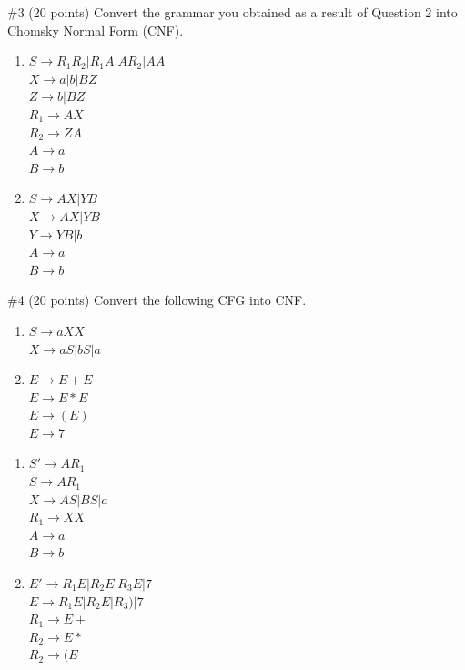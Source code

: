 \begin{problem}{\#3 (20 points)}
    Convert the grammar you obtained as a result of Question 2 into Chomsky Normal Form (CNF).
\end{problem}
\begin{solution}
    \begin{enumerate}[label=\alph*)]
        \item $S \to R_1R_2 | R_1A | AR_2 | AA $\\
        $X \to a | b | BZ$\\
        $Z \to b | BZ$\\
        $R_1 \to AX$\\
        $R_2 \to ZA$\\
        $A \to a$\\
        $B \to b$
        \item $S \to AX | YB$\\
        $X \to AX | YB$\\
        $Y \to YB | b$\\
        $A \to a$\\
        $B \to b$
    \end{enumerate}
\end{solution}

\begin{problem}{\#4 (20 points)}
    Convert the following CFG into CNF.
    \begin{enumerate}[label=\alph*)]
        \item $S \to aXX$\\
        $X \to aS | bS | a$
        \item $E \to E + E$\\
        $E \to E * E$\\
        $E \to \left( E \right)$\\
        $E \to 7$ 
    \end{enumerate}
\end{problem}
\begin{solution}
    \begin{enumerate}[label=\alph*)]
        \item $S' \to AR_1$\\
        $S \to AR_1$\\
        $X \to AS|BS|a$\\
        $R_1 \to XX$\\
        $A \to a$\\
        $B \to b$
        \item $E' \to R_1E | R_2E | R_3E | 7$\\
        $E \to R_1E | R_2E | R_3) | 7$\\
        $R_1 \to E+$\\
        $R_2 \to E*$\\
        $R_2 \to (E$\\
    \end{enumerate}
\end{solution}

